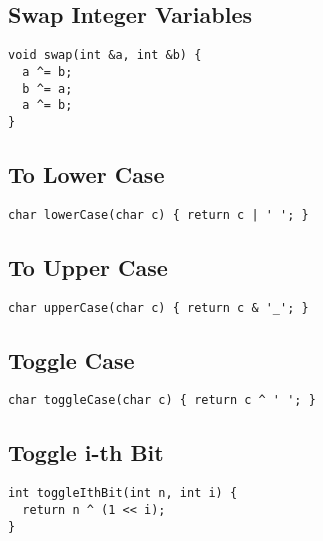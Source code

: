 \documentclass[twoside]{article}
\begin{document}
\begin{multicols*}{2}
\subsection*{Swap Integer Variables}
\begin{verbatim}
void swap(int &a, int &b) {
  a ^= b;
  b ^= a;
  a ^= b;
}
\end{verbatim}

\subsectionfont{\large\bfseries\sffamily\underline}
\subsection*{To Lower Case}
\begin{verbatim}
char lowerCase(char c) { return c | ' '; }
\end{verbatim}

\subsectionfont{\large\bfseries\sffamily\underline}
\subsection*{To Upper Case}
\begin{verbatim}
char upperCase(char c) { return c & '_'; }
\end{verbatim}

\subsectionfont{\large\bfseries\sffamily\underline}
\subsection*{Toggle Case}
\begin{verbatim}
char toggleCase(char c) { return c ^ ' '; }
\end{verbatim}

\subsectionfont{\large\bfseries\sffamily\underline}
\subsection*{Toggle i-th Bit}
\begin{verbatim}
int toggleIthBit(int n, int i) {
  return n ^ (1 << i);
}
\end{verbatim}

\subsectionfont{\large\bfseries\sffamily\underline}

\end{multicols*}
\end{document}
